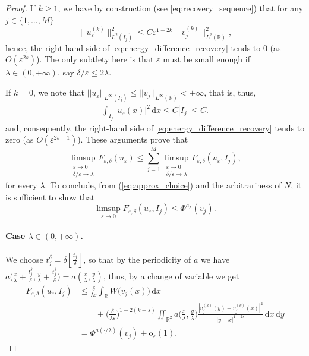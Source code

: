 \documentclass[10pt,a4paper]{amsart}
\newcommand{\R}{\mathbb{R}}
\newcommand{\del}{\delta}
\newcommand{\de}{\mathrm{d}}
\newcommand{\e}{\varepsilon}
\newcommand{\mr}{\mathrm}
\begin{document}
\begin{proof}
If $k\geq 1$, we have by construction (see \eqref{eq:recovery_sequence}) that for any $j\in\{1,\dots, M\}$
\[\|u_\e^{(k)}\|^2_{L^2(I_j)} \leq C \e^{1-2k}\|v_j^{(k)}\|^2_{L^2(\R)},\] 
hence, the right-hand side of \eqref{eq:energy_difference_recovery} tends to 0 (as $O(\e^{2s})$). The only subtlety here is that $\e$ must be small enough if $\lambda \in (0,+\infty)$, say $\delta/\e \leq 2\lambda$.
    
If $k=0$, we note that $||u_\e||_{L^\infty(I_j)}\leq ||v_j||_{L^\infty(\R)}<+\infty$, that is, thus,
\[
\begin{split}
    \int_{I_j}|u_\e(x)|^2\,\de x \leq C |I_j|\leq C.
\end{split}
\]
and, consequently, the right-hand side of \eqref{eq:energy_difference_recovery} tends to zero (as $O(\e^{2s-1})$). These arguments prove that
    \[\limsup_{\substack{\e\to 0 \\ \del/\e\to\lambda}} F_{\e,\delta}(u_\e) \leq \sum_{j=1}^M
   \limsup_{\substack{\e\to 0 \\ \del/\e\to\lambda}}F_{\e,\delta}(u_\e,I_j),\]
   for every $\lambda$. To conclude, from (\ref{eq:approx_choice}) and the arbitrariness of $N$, it is sufficient to show that $$\limsup_{\e \rightarrow 0} F_{\e,\delta}(u_\e, I_j) \leq \Phi^{a_\lambda}(v_j).$$ 


    
    \paragraph{Case $\lambda\in (0,+\infty)$.}  We choose  $t_j^\delta = \delta \left\lfloor\frac{t_j}{\delta}\right\rfloor$, so that by the periodicity of $a$ we have $a\Big( \frac{x}{\lambda}+\frac{t^\delta_j}{\del}, \frac{y}{\lambda}+\frac{t^\delta_j}{\del}\Big) = a\left( \frac{x}{\lambda}, \frac{y}{\lambda}\right)$, thus, by a change of variable we get
    \begin{equation*}
      \begin{split}
             F_{\e,\delta}(u_\e, I_j)
             &\le\frac{\del}{\lambda\e}\int_\R W\big(v_j(  x)\big) \,\de  x\\
               &\qquad +\Big(\frac{\del}{\lambda\e}\Big)^{1-2(k+s)}\iint_{\R^2}a\Big( \frac{x}{\lambda}, \frac{y}{\lambda}\Big)\frac{|v_{j}^{(k)}(  y)-v^{(k)}_{j}( x)|^2}{|y-x|^{1+2s}} \,\de x\,\de y\\
                   &=\Phi^{a(\cdot/\lambda)}(v_j)+\mr o_\e(1).
      \end{split}
    \end{equation*}

\end{proof}
\end{document}
